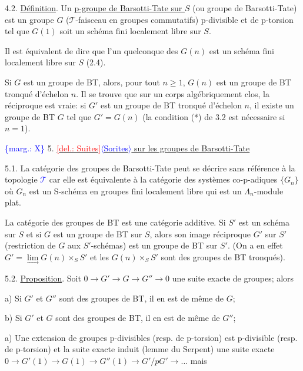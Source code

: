 \documentclass[11pt]{article}
\newcommand{\scanpage}[1]{\par\bigskip\noindent{\small\sffamily[scan #1]}\par}
\newcommand{\mspage}[1]{{\small\sffamily[p.\,#1]}}
\newcommand{\hand}[1]{\textcolor{blue}{#1}}
\newcommand{\inserted}[2][]{\textcolor{blue}{$\langle$#2$\rangle$}}
\newcommand{\margin}[1]{\textcolor{blue}{\{\textsf{marg.:} #1\}}}
\newcommand{\deleted}[1]{\textcolor{red}{[\textsf{del.:} #1]}}
\newcommand{\uline}[1]{\underline{#1}}
\begin{document}
4.2. \uline{Définition}. Un \uline{p-groupe de Barsotti-Tate sur $S$} (ou groupe
de Barsotti-Tate) est un groupe $G$ ($\mathcal{T}$-faisceau en groupes commutatifs)
p-divisible et de p-torsion tel que $G(1)$ soit un schéma fini localement
libre sur $S$.

Il est équivalent de dire que l'un quelconque des $G(n)$ est
un schéma fini localement libre sur $S$ (2.4).

\mspage{\hand{62}}

\clearpage
\scanpage{129/63}
\mspage{\hand{III-8}}

Si $G$ est un groupe de BT, alors, pour tout $n \geq 1$, $G(n)$
est un groupe de BT tronqué d'échelon $n$. Il se trouve que sur un
corps algébriquement clos, la réciproque est vraie: si $G'$ est un
groupe de BT tronqué d'échelon $n$, il existe un groupe de BT $G$ tel
que $G' = G(n)$ (la condition (*) de 3.2 est nécessaire si $n = 1$).

\margin{X} 5. \uline{\deleted{Suites}\inserted{Sorites} sur les groupes de Barsotti-Tate}

5.1. La catégorie des groupes de Barsotti-Tate peut se décrire sans
référence à la topologie \hand{$\mathcal{T}$} car elle est équivalente à la catégorie
des systèmes co-p-adiques $\{G_n\}$ où $G_n$ est un S-schéma en groupes fini
localement libre qui est un $\Lambda_n$-module plat.

La catégorie des groupes de BT est une catégorie additive.
Si $S'$ est un schéma sur $S$ et si $G$ est un groupe de BT sur $S$,
alors son image réciproque $G'$ sur $S'$ (restriction de $G$ aux
$S'$-schémas) est un groupe de BT sur $S'$. (On a en effet
$G' = \lim\limits_{\rightarrow} G(n) \times_S S'$ et les $G(n) \times_S S'$ sont des groupes de BT tronqués).

5.2. \uline{Proposition}. Soit $0 \rightarrow G' \rightarrow G \rightarrow G'' \rightarrow 0$ une suite exacte
de groupes; alors

a) Si $G'$ et $G''$ sont des groupes de BT, il en est de même de $G$;

b) Si $G'$ et $G$ sont des groupes de BT, il en est de même de $G''$;

a) Une extension de groupes p-divisibles (resp. de p-torsion) est
p-divisible (resp. de p-torsion) et la suite exacte induit (lemme du
Serpent) une suite exacte $0 \rightarrow G'(1) \rightarrow G(1) \rightarrow G''(1) \rightarrow G'/pG' \rightarrow \ldots$ mais
\end{document}
